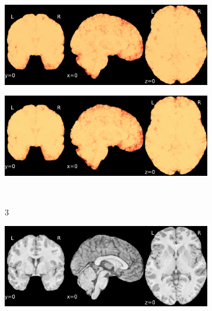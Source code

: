 \documentclass{article}
\begin{document}
\begin{appendices}
\begin{landscape}
\begin{figure}
\begin{subfigure}[t]{0.2\paperheight}
            \end{subfigure}
            \begin{subfigure}[t]{0.2\paperheight}
                \centering
                \includegraphics[width=\textwidth]{figures/sig/0mm/rs_ds001771_sub-36_sig.pdf}
            \end{subfigure}
            \begin{subfigure}[t]{0.2\paperheight}
                \centering
                \includegraphics[width=\textwidth]{figures/sig/0mm/rr.rs_ds001771_sub-36_sig.pdf}
            \end{subfigure} \\
            \begin{subfigure}[b][][c]{0.01\paperwidth} 3 \vspace*{15pt} \end{subfigure}
            \begin{subfigure}[t]{0.2\paperheight}
                \centering
                \includegraphics[width=\textwidth]{figures/sig/0mm/ieee_ds000256_sub-CTS201.pdf}

\end{subfigure}
\end{figure}
\end{landscape}
\end{appendices}
\end{document}
